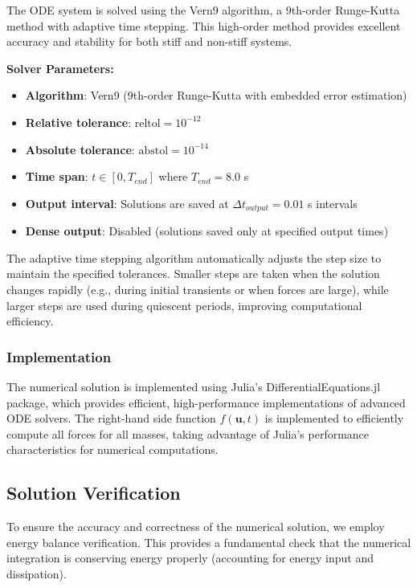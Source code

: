 \documentclass[11pt,a4paper]{article}
\begin{document}
The ODE system is solved using the Vern9 algorithm, a 9th-order Runge-Kutta method with adaptive time stepping. This high-order method provides excellent accuracy and stability for both stiff and non-stiff systems. \newline

\noindent \textbf{Solver Parameters:}
\begin{itemize}
    \item \textbf{Algorithm}: Vern9 (9th-order Runge-Kutta with embedded error estimation)
    \item \textbf{Relative tolerance}: $\text{reltol} = 10^{-12}$
    \item \textbf{Absolute tolerance}: $\text{abstol} = 10^{-14}$
    \item \textbf{Time span}: $t \in [0, T_{end}]$ where $T_{end} = 8.0$ s
    \item \textbf{Output interval}: Solutions are saved at $\Delta t_{output} = 0.01$ s intervals
    \item \textbf{Dense output}: Disabled (solutions saved only at specified output times)
\end{itemize}

\noindent The adaptive time stepping algorithm automatically adjusts the step size to maintain the specified tolerances. Smaller steps are taken when the solution changes rapidly (e.g., during initial transients or when forces are large), while larger steps are used during quiescent periods, improving computational efficiency.

\subsubsection{Implementation}

\noindent The numerical solution is implemented using Julia's DifferentialEquations.jl package, which provides efficient, high-performance implementations of advanced ODE solvers. The right-hand side function $f(\mathbf{u}, t)$ is implemented to efficiently compute all forces for all masses, taking advantage of Julia's performance characteristics for numerical computations.

\subsection{Solution Verification}

\noindent To ensure the accuracy and correctness of the numerical solution, we employ energy balance verification. This provides a fundamental check that the numerical integration is conserving energy properly (accounting for energy input and dissipation).
\end{document}
